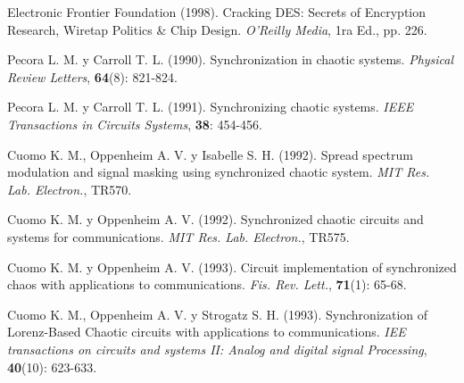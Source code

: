 


\begin{thebibliography}{00}

Electronic Frontier Foundation (1998).
\newblock Cracking DES: Secrets of Encryption Research, Wiretap Politics \& Chip Design.
\newblock \emph{O'Reilly Media}, 1ra Ed., pp. 226.

Pecora L. M. y Carroll T. L. (1990).
\newblock Synchronization in chaotic systems.
\newblock \emph{Physical Review Letters}, \textbf{64}(8): 821-824.

Pecora L. M. y Carroll T. L. (1991).
\newblock Synchronizing chaotic systems.
\newblock \emph{IEEE Transactions in Circuits Systems}, \textbf{38}: 454-456.

Cuomo K. M., Oppenheim A. V. y Isabelle S. H. (1992).
\newblock Spread spectrum modulation and signal masking using synchronized chaotic system.
\newblock \emph{MIT Res. Lab. Electron.}, TR570.

Cuomo K. M. y Oppenheim A. V. (1992).
\newblock Synchronized chaotic circuits and systems for communications.
\newblock \emph{MIT Res. Lab. Electron.}, TR575.

Cuomo K. M. y Oppenheim A. V. (1993).
\newblock Circuit implementation of synchronized chaos with applications to communications.
\newblock \emph{Fis. Rev. Lett.}, \textbf{71}(1): 65-68.

Cuomo K. M., Oppenheim A. V. y Strogatz S. H. (1993).
\newblock Synchronization of Lorenz-Based Chaotic circuits with applications to communications.
\newblock \emph{IEE transactions on circuits and systems II: Analog and digital signal Processing}, \textbf{40}(10): 623-633.


\end{thebibliography}
